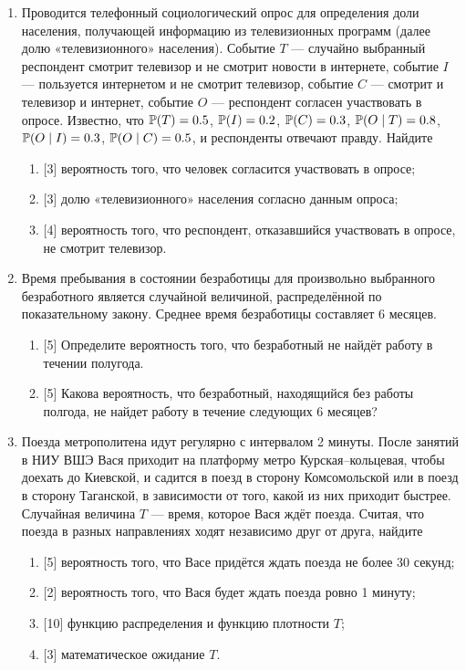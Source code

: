 \begin{enumerate}
\item Проводится телефонный социологический опрос для определения доли населения, 
получающей информацию из телевизионных программ (далее долю «телевизионного» населения). 
Событие $T$ — случайно выбранный респондент смотрит телевизор и не смотрит новости в интернете, 
событие $I$ — пользуется интернетом и не смотрит телевизор, 
событие $C$ — смотрит и телевизор и интернет, событие $O$ — респондент согласен участвовать в опросе. 
Известно, что $\P(T)=0.5$, $\P(I)=0.2$, $\P(C)=0.3$, $\P(O\mid T)=0.8$, $\P(O\mid I)=0.3$, $\P(O \mid C)=0.5$, 
и респонденты отвечают правду. Найдите 
\begin{enumerate}
\item 	{[3]} вероятность того, что человек согласится участвовать в опросе;
\item 	{[3]} долю «телевизионного» населения согласно данным опроса;
\item 	{[4]} вероятность того, что респондент, отказавшийся участвовать в опросе, не смотрит телевизор.
\end{enumerate}


\item Время пребывания в состоянии безработицы для произвольно выбранного безработного является случайной величиной, распределённой по показательному закону. 
Среднее время безработицы составляет 6 месяцев. 
\begin{enumerate}
\item 	{[5]} Определите вероятность того, что безработный не найдёт работу в течении полугода. 
\item 	{[5]} Какова вероятность, что безработный, находящийся без работы полгода, не найдет работу в течение следующих 6 месяцев?
\end{enumerate}

\item Поезда метрополитена идут регулярно с интервалом 2 минуты. 
После занятий в НИУ ВШЭ Вася приходит на платформу метро Курская–кольцевая, чтобы доехать до Киевской, 
и садится в поезд в сторону Комсомольской или в поезд в сторону Таганской, 
в зависимости от того, какой из них приходит быстрее.  
Случайная величина $T$ — время, которое Вася ждёт поезда. 
Считая, что поезда в разных направлениях ходят независимо друг от друга, найдите
\begin{enumerate}
\item 	{[5]} вероятность того, что Васе придётся ждать поезда не более 30 секунд;
\item 	{[2]} вероятность того, что Вася будет ждать поезда ровно 1 минуту;
\item 	{[10]} функцию распределения и функцию плотности $T$;
\item 	{[3]} математическое ожидание $T$.
\end{enumerate}

\end{enumerate}

